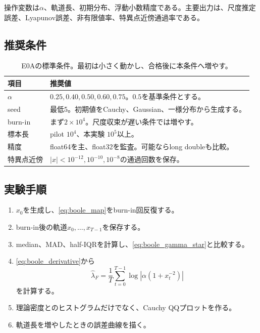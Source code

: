 \documentclass[a4paper,11pt,oneside,openany]{ltjsbook}
\begin{document}
操作変数は\(\alpha\)、軌道長、初期分布、浮動小数精度である。主要出力は、尺度推定誤差、Lyapunov誤差、非有限値率、特異点近傍通過率である。

\subsection{推奨条件}

\begin{table}[htbp]
\centering
\caption{E0Aの標準条件。最初は小さく動かし、合格後に本条件へ増やす。}
\label{tab:e0a_config}
\begin{tabularx}{\textwidth}{p{37mm}X}
\toprule
項目 & 推奨値 \\
\midrule
\(\alpha\) & \(0.25,0.40,0.50,0.60,0.75\)。\(0.5\)を基準条件とする。\\
seed & 最低5。初期値をCauchy、Gaussian、一様分布から生成する。\\
burn-in & まず\(2\times10^4\)。尺度収束が遅い条件では増やす。\\
標本長 & pilot \(10^4\)、本実験 \(10^5\)以上。\\
精度 & float64を主、float32を監査。可能ならlong doubleも比較。\\
特異点近傍 & \(|x|<10^{-12},10^{-10},10^{-8}\)の通過回数を保存。\\
\bottomrule
\end{tabularx}
\end{table}

\subsection{実験手順}

\begin{enumerate}
  \item \(x_0\)を生成し、\cref{eq:boole_map}をburn-in回反復する。
  \item burn-in後の軌道\(x_0,\dots,x_{T-1}\)を保存する。
  \item median、MAD、half-IQRを計算し、\cref{eq:boole_gamma_star}と比較する。
  \item \cref{eq:boole_derivative}から
  \begin{equation}
    \widehat\lambda_F
    =\frac1T\sum_{t=0}^{T-1}
      \log\left|\alpha\left(1+x_t^{-2}\right)\right|
    \label{eq:empirical_boole_lyap}
  \end{equation}
  を計算する。
  \item 理論密度とのヒストグラムだけでなく、Cauchy QQプロットを作る。
  \item 軌道長を増やしたときの誤差曲線を描く。
\end{enumerate}
\end{document}
